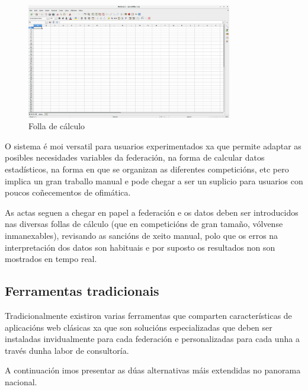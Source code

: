     \begin{figure}[h!]
	  \begin{center}
	    \includegraphics[width=0.8\textwidth]{./img/calculo.png}
	    \caption{Folla de cálculo}
	    \label{fig:img:calculo}
	  \end{center}
    \end{figure}

    O sistema é moi versatil para usuarios experimentados xa que permite adaptar 
as posibles necesidades variables da federación, na forma de calcular 
datos estadísticos, na forma en que se organizan as diferentes competicións, 
etc pero implica un gran traballo manual e pode chegar a ser un suplicio para 
usuarios con poucos coñecementos de ofimática.

  As actas seguen a chegar en papel a federación e os datos deben ser introducidos nas 
diversas follas de cálculo (que en competicións de gran tamaño, vólvense inmanexables), 
revisando as sancións de xeito manual, polo que os erros na interpretación dos datos son 
habituais e por suposto os resultados non son mostrados en tempo real.

    \subsection{Ferramentas tradicionais}

    Tradicionalmente existiron varias ferramentas que comparten características 
de aplicacións web clásicas xa que son solucións especializadas que deben ser 
instaladas invidualmente para cada federación e personalizadas para cada unha a 
través dunha labor de consultoría.

    A continuación imos presentar as dúas alternativas máis extendidas no 
panorama nacional.



